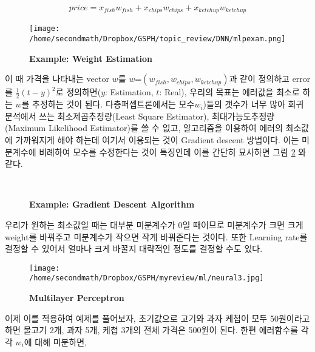 \documentclass[10pt]{article}
\begin{document}
\begin{align}
price = x_{fish}w_{fish} + x_{chips}w_{chips} + x_{ketchup}w_{ketchup}
\end{align}

\begin{figure}[!ht]
\centering
\texttt{[image: /home/secondmath/Dropbox/GSPH/topic\_review/DNN/mlpexam.png]}
\caption{\bf {Example: Weight Estimation}}
\label{mlpexam}
\end{figure}


이 때 가격을 나타내는 vector $w$를 $w$=$(w_{fish},w_{chips},w_{ketchup})$과 같이 정의하고 error를 $\frac{1}{2}(t-y)^2$로 정의하면($y$: Estimation, $t$: Real), 우리의 목표는 에러값을 최소로 하는 $w$를 추정하는 것이 된다. 다층퍼셉트론에서는 모수$w_i$)들의 갯수가 너무 많아  회귀분석에서 쓰는 최소제곱추정량(Least Square Estimator), 최대가능도추정량(Maximum Likelihood Estimator)를 쓸 수 없고, 알고리즘을 이용하여 에러의 최소값에 가까워지게 해야 하는데 여기서 이용되는 것이 Gradient descent 방법이다. 이는 미분계수에 비례하여 모수를 수정한다는 것이 특징인데 이를 간단히 묘사하면 그림 \ref{gradient} 와 같다\cite{gradient}. 

\begin{figure}
\centering
{} 
\\
\caption{\bf{Example: Gradient Descent Algorithm}}
\label{gradient}
\end{figure}

우리가 원하는 최소값일 때는 대부분 미분계수가 0일 때이므로 미분계수가 크면 크게 weight를 바꿔주고 미분계수가 작으면 작게 바꿔준다는 것이다. 또한 Learning rate를 결정할 수 있어서 얼마나 크게 바꿀지 대략적인 정도를 결정할 수도 있다. 

\begin{figure}[!ht]
\centering
\texttt{[image: /home/secondmath/Dropbox/GSPH/myreview/ml/neural3.jpg]}
\caption{\bf{Multilayer Perceptron}}
\label{mlp}
\end{figure}


이제 이를 적용하여 예제를 풀어보자, 초기값으로 고기와 과자 케첩이 모두 50원이라고 하면 물고기 2개, 과자 5개, 케첩 3개의 전체 가격은 500원이 된다. 한편 에러함수를 각각 $w_i$에 대해 미분하면, 
\end{document}
